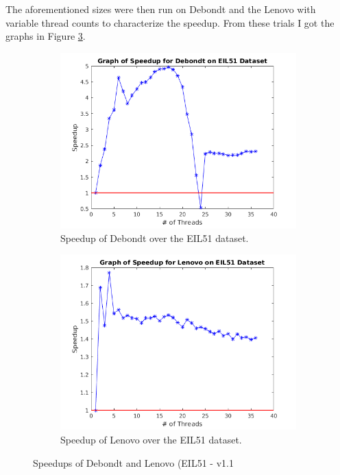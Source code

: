 \documentclass[10pt,letterpaper]{article}
\begin{document}
The aforementioned sizes were then run on Debondt and the Lenovo with variable thread counts to characterize the speedup. From these trials I got the graphs in Figure \ref{fig:EILspeedups}.


\begin{figure}[t]
\centering
   \begin{subfigure}{0.49\linewidth} \centering
	\includegraphics[width=\textwidth]{../img/Debondt_speedup.png} 
     \caption{Speedup of Debondt over the EIL51 dataset.}\label{fig:figA}
   \end{subfigure}
   \begin{subfigure}{0.49\linewidth} \centering
	\includegraphics[width=\textwidth]{../img/Lenovo_Speedup.png} 
     \caption{Speedup of Lenovo over the EIL51 dataset.}\label{fig:figB}
   \end{subfigure}
\caption{Speedups of Debondt and Lenovo (EIL51 - v1.1} \label{fig:EILspeedups}
\end{figure}
\end{document}
